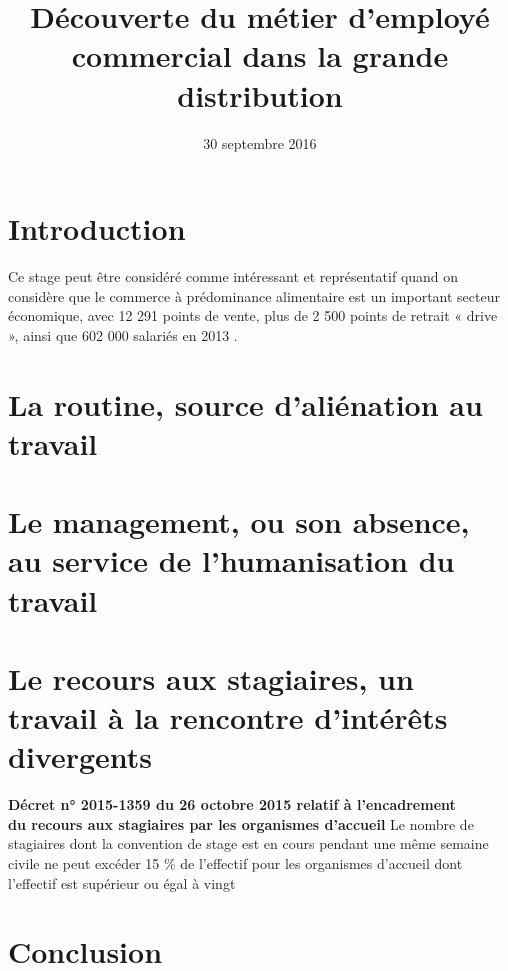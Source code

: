 \documentclass{enpc-ippex}
\title{Découverte du métier d'employé commercial dans la grande distribution}
\date{30 septembre 2016}
\begin{document}
\maketitle

\tableofcontents

\part*{Introduction}
Ce stage peut être considéré comme intéressant et représentatif quand on considère que le commerce à prédominance alimentaire est un important secteur économique, avec 12 291 points de vente, plus de 2 500 points de retrait « drive », ainsi que 602 000 salariés en 2013 \cite{forco}.

\part{La routine, source d'aliénation au travail}

\part{Le management, ou son absence, au service de l'humanisation du travail}

\part{Le recours aux stagiaires, un travail à la rencontre d’intérêts divergents}

\begin{chapquote}{\textbf{Décret n° 2015-1359 du 26 octobre 2015 relatif à l'encadrement \\ du recours aux stagiaires par les organismes d'accueil}}
Le nombre de stagiaires dont la convention de stage est en cours pendant une même semaine civile ne peut excéder 15 \% de l'effectif pour les organismes d'accueil dont l'effectif est supérieur ou égal à vingt
\end{chapquote}

\part*{Conclusion}

%
% 

\pagebreak

\appendix
\end{document}
